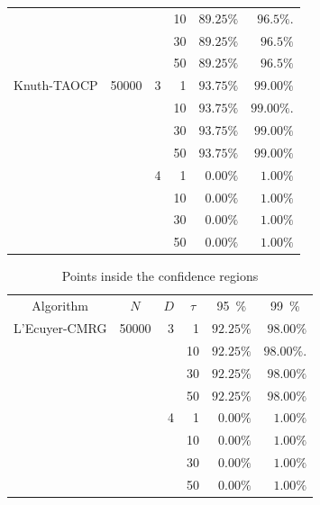 \documentclass[12pt]{article}
\begin{document}
\begin{description}
\begin{table}[!h]
\begin{tabular}{c*{5}r}
	&  & & 10 & $89.25\%$ & $96.5\%.$\\
	&  & & 30 & $89.25\%$ & $96.5\%$\\
	&  & & 50 & $89.25\%$ & $96.5\%$\\ 
	\cmidrule(lr){1-6}
	Knuth-TAOCP & 50000 & 3 & 1 & $93.75\%$ & $99.00\%$\\
	&  & & 10 & $93.75\%$ & $99.00\%.$\\
	&  & & 30 & $93.75\%$ & $99.00\%$\\
	&  & & 50 & $93.75\%$ & $99.00\%$\\ 
	\cmidrule(lr){3-6}
	&  & 4 & 1 & $0.00\%$ & $1.00\%$\\
	&  &   & 10& $0.00\%$ & $1.00\%$\\
	&  &  & 30 & $0.00\%$ & $1.00\%$\\
	&  &  & 50 & $0.00\%$ & $1.00\%$\\
	\cmidrule(lr){1-6}
	\bottomrule
\end{tabular}
\end{table}

\begin{table}[!h]
	\centering
	\caption{Points inside the confidence regions}
	\label{tab:result1}
	\begin{tabular}{c*{5}r}
		\toprule
		Algorithm & \multicolumn{1}{c}{$N$} & \multicolumn{1}{c}{$D$} & \multicolumn{1}{c}{$\tau$} & \multicolumn{1}{c}{\SI{95}{\percent}} & \multicolumn{1}{c}{\SI{99}{\percent}}\\
		\cmidrule(lr){1-1}
		\cmidrule(lr){2-2}
		\cmidrule(lr){3-3}
		\cmidrule(lr){4-4}
		\cmidrule(lr){5-5}
		\cmidrule(lr){6-6}
		L'Ecuyer-CMRG & 50000 & 3 & 1 & $92.25 \%$ & $98.00\%$\\
		&  & & 10 & $92.25\%$ & $98.00\%.$\\
		&  & & 30 & $92.25\%$ & $98.00\%$\\
		&  & & 50 & $92.25\%$ & $98.00\%$\\ 
		\cmidrule(lr){3-6}
		&  & 4 & 1 & $0.00\%$ & $1.00\%$\\
		&  &   & 10& $0.00\%$ & $1.00\%$\\
		&  &  & 30 & $0.00\%$ & $1.00\%$\\
		&  &  & 50 & $0.00\%$ & $1.00\%$\\
		\cmidrule(lr){1-6}
		\bottomrule
	\end{tabular}
\end{table}


\end{description}
\end{document}
